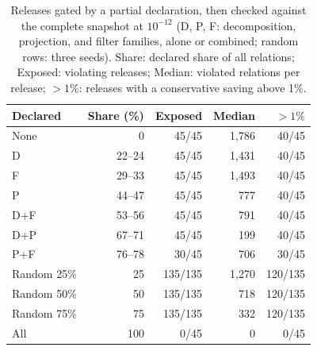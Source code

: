 \begin{table}[t]
\centering
\caption{Releases gated by a partial declaration, then checked against the complete snapshot at $10^{-12}$ (D, P, F: decomposition, projection, and filter families, alone or combined; random rows: three seeds). Share: declared share of all relations; Exposed: violating releases; Median: violated relations per release; ${>}1\%$: releases with a conservative saving above 1\%.}
\label{tab:coverage}
\footnotesize
\setlength{\tabcolsep}{4pt}
\begin{tabular}{@{}lrrrr@{}}
\toprule
Declared & Share (\%) & Exposed & Median & ${>}1\%$ \\
\midrule
None & 0 & 45/45 & 1{,}786 & 40/45 \\
D & 22--24 & 45/45 & 1{,}431 & 40/45 \\
F & 29--33 & 45/45 & 1{,}493 & 40/45 \\
P & 44--47 & 45/45 & 777 & 40/45 \\
D+F & 53--56 & 45/45 & 791 & 40/45 \\
D+P & 67--71 & 45/45 & 199 & 40/45 \\
P+F & 76--78 & 30/45 & 706 & 30/45 \\
Random 25\% & 25 & 135/135 & 1{,}270 & 120/135 \\
Random 50\% & 50 & 135/135 & 718 & 120/135 \\
Random 75\% & 75 & 135/135 & 332 & 120/135 \\
All & 100 & 0/45 & 0 & 0/45 \\
\bottomrule
\end{tabular}
\end{table}
